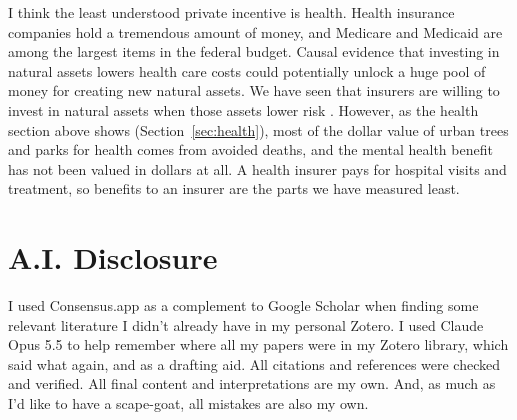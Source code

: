 \documentclass[12pt]{article}
\begin{document}
I think the least understood private incentive is health. Health insurance companies hold a tremendous amount of money, and Medicare and Medicaid are among the largest items in the federal budget. Causal evidence that investing in natural assets lowers health care costs could potentially unlock a huge pool of money for creating new natural assets. We have seen that insurers are willing to invest in natural assets when those assets lower risk \citep{kouskyNatureInsuranceInsurance2025, schelskeInsuringNaturalEcosystems2021}. However, as the health section above shows (Section~\ref{sec:health}), most of the dollar value of urban trees and parks for health comes from avoided deaths, and the mental health benefit has not been valued in dollars at all. A health insurer pays for hospital visits and treatment, so benefits to an insurer are the parts we have measured least.

\section{A.I. Disclosure}\label{sec:ai}

I used Consensus.app as a complement to Google Scholar when finding some relevant literature I didn't already have in my personal Zotero. I used Claude Opus 5.5 to help remember where all my papers were in my Zotero library, which said what again, and as a drafting aid. All citations and references were checked and verified. All final content and interpretations are my own. And, as much as I'd like to have a scape-goat, all mistakes are also my own.


\newpage


\end{document}
